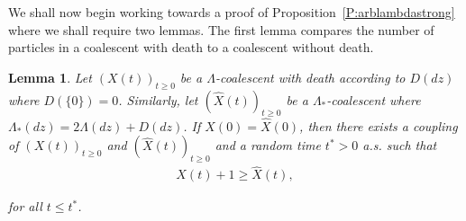\documentclass[11pt]{article}
\newtheorem{lemma}{Lemma}
\theoremstyle{definition}
\newcommand{\propref}[1]{Proposition~\ref{P:#1}}
\begin{document}
\noindent We shall now begin working towards a proof of \propref{arblambdastrong} where we shall require two lemmas. The first lemma compares the number of particles in a coalescent with death to a coalescent without death.

\begin{lemma}\label{L:removedeath}
    Let $(X(t))_{t \geq 0}$ be a $\Lambda$-coalescent with death according to $D(dz)$ where $D(\{0\}) = 0$. Similarly, let $(\widehat{X}(t))_{t \geq 0}$ be a $\Lambda_*$-coalescent where $\Lambda_*(dz) = 2\Lambda(dz) + D(dz)$. If $X(0) = \widehat{X}(0)$, then there exists a coupling of $(X(t))_{t \geq 0}$ and $(\widehat{X}(t))_{t \geq 0}$ and a random time $t^* > 0$ a.s. such that
    \begin{align*}
        X(t)+1 \geq \widehat{X}(t),
    \end{align*}

    \noindent for all $t \leq t^*$.
\end{lemma}
\end{document}
